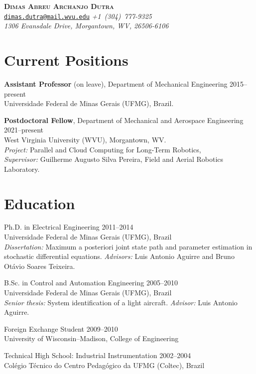 \documentclass[letterpaper, 11pt, oneside]{memoir}
\begin{document}
\thispagestyle{plain}

\begin{center}
  {
    \LARGE \bfseries \scshape 
    Dimas Abreu Archanjo Dutra
  }
  \\[1ex]
  \small
  \texttt{\href{mailto:dimas.dutra@mail.wvu.edu}{dimas.dutra@mail.wvu.edu}}
  \itshape\qquad
  +1~(304)~777-9325
  \\
  1306 Evansdale Drive, Morgantown, WV, 26506-6106
\end{center}

\section{Current Positions}

\begin{description}
\item \textbf{Assistant Professor} (on leave), 
  Department of Mechanical Engineering
  \hfill 2015--present
  \\
  Universidade Federal de Minas Gerais (UFMG), Brazil.

\item \textbf{Postdoctoral Fellow}, 
  Department of Mechanical and Aerospace Engineering
  \hfill 2021--present
  \\
  West Virginia University (WVU), Morgantown, WV. 
  \\
  \emph{Project:} Parallel and Cloud Computing for Long-Term Robotics,
  \\
  \emph{Supervisor:} Guilherme Augusto Silva Pereira, 
  Field and Aerial Robotics Laboratory.
\end{description}

\section{Education}
\begin{description}
\item Ph.D. in Electrical Engineering \hfill 2011--2014
  \\
  Universidade Federal de Minas Gerais (UFMG), Brazil
  \\
  \emph{Dissertation:} Maximum a posteriori joint state path and
  parameter estimation in stochastic differential equations.
  \emph{Advisors:} Luis Antonio Aguirre and Bruno Otávio Soares Teixeira.

\item B.Sc. in Control and Automation Engineering
  \hfill 2005--2010
  \\
  Universidade Federal de Minas Gerais (UFMG), Brazil
  \\
  \textit{Senior thesis:} System identification of a light aircraft.
  \emph{Advisor:} Luis Antonio Aguirre.
\item Foreign Exchange Student \hfill 2009--2010
  \\
  University of Wisconsin--Madison, College of Engineering
\item Technical High School: Industrial Instrumentation \hfill 2002--2004
  \\
  Colégio Técnico do Centro Pedagógico da UFMG (Coltec), Brazil
\end{description}
\end{document}
